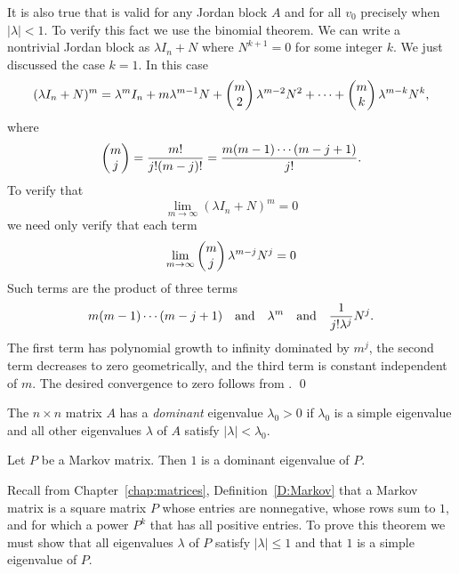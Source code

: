 It is also true that  is valid for any Jordan block 
$A$ and for all $v_0$ precisely when $|\lambda|<1$.  To verify this fact 
we use the binomial theorem.  
We can write a nontrivial Jordan block as
$\lambda I_n+N$ where $N^{k+1}=0$ for some integer $k$.  We just discussed 
the case $k=1$.  In this case
\[
(\lambda I_n+N)^m = \lambda^mI_n+m\lambda^{m-1}N + 
\left(\begin{array}{@{}c@{}} m\\2\end{array}\right)\lambda^{m-2}N^2
+\cdots+
\left(\begin{array}{@{}c@{}} m\\k \end{array}\right)\lambda^{m-k}N^k,
\]
where
\[
\left(\begin{array}{@{}c@{}} m \\ j\end{array}\right)
 = \frac{m!}{j!(m-j)!}=\frac{m(m-1)\cdots(m-j+1)}{j!}.
\]
To verify that 
\[
\lim_{m\to\infty}(\lambda I_n+N)^m = 0
\]
we need only verify that each term
\[
\lim_{m\to\infty}\left(\begin{array}{@{}c@{}} m\\j \end{array}\right)
\lambda^{m-j}N^j = 0
\]
Such terms are the product of three terms 
\[
m(m-1)\cdots(m-j+1) \quad\mbox{and}\quad \lambda^m \quad\mbox{and}\quad \frac{1}{j!\lambda^j}N^j.
\]
The first term has polynomial growth to infinity dominated by $m^j$, the 
second term decreases to zero geometrically, and the third term is 
constant independent of $m$. The desired convergence to zero follows from 
.  \qed

\begin{Def}  The $n\times n$ matrix $A$ has a {\em dominant\/} eigenvalue 
$\lambda_0>0$ if $\lambda_0$ is a simple eigenvalue and all other eigenvalues
$\lambda$ of $A$ satisfy $|\lambda|<\lambda_0$.
\end{Def}


\begin{thm}  \label{T:Markovdom}
Let $P$ be a Markov matrix. Then $1$ is a dominant eigenvalue of $P$.
\end{thm}

\proof  Recall from Chapter~\ref{chap:matrices}, Definition~\ref{D:Markov} 
that a Markov matrix is a square matrix $P$ whose entries are nonnegative, 
whose rows sum to $1$, and for which a power $P^k$ that has all positive 
entries.  To prove this theorem we must show that all eigenvalues $\lambda$ 
of $P$ satisfy $|\lambda|\leq 1$ and that $1$ is a simple eigenvalue of $P$.

